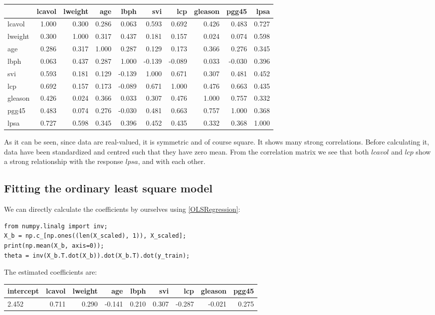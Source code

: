 \documentclass[12pt, letterpaper]{article}
\theoremstyle{definition}
\begin{document}
\begin{tabular}{lrrrrrrrrr}
\toprule
{} &  lcavol &  lweight &    age &   lbph &    svi &    lcp &  gleason &  pgg45 &   lpsa \\
\midrule
lcavol  &   1.000 &    0.300 &  0.286 &  0.063 &  0.593 &  0.692 &    0.426 &  0.483 &  0.727 \\
lweight &   0.300 &    1.000 &  0.317 &  0.437 &  0.181 &  0.157 &    0.024 &  0.074 &  0.598 \\
age     &   0.286 &    0.317 &  1.000 &  0.287 &  0.129 &  0.173 &    0.366 &  0.276 &  0.345 \\
lbph    &   0.063 &    0.437 &  0.287 &  1.000 & -0.139 & -0.089 &    0.033 & -0.030 &  0.396 \\
svi     &   0.593 &    0.181 &  0.129 & -0.139 &  1.000 &  0.671 &    0.307 &  0.481 &  0.452 \\
lcp     &   0.692 &    0.157 &  0.173 & -0.089 &  0.671 &  1.000 &    0.476 &  0.663 &  0.435 \\
gleason &   0.426 &    0.024 &  0.366 &  0.033 &  0.307 &  0.476 &    1.000 &  0.757 &  0.332 \\
pgg45   &   0.483 &    0.074 &  0.276 & -0.030 &  0.481 &  0.663 &    0.757 &  1.000 &  0.368 \\
lpsa    &   0.727 &    0.598 &  0.345 &  0.396 &  0.452 &  0.435 &    0.332 &  0.368 &  1.000 \\
\bottomrule
\end{tabular}
As it can be seen, since data are real-valued, it is symmetric and of course square. It shows many strong correlations. Before calculating it, data have been standardized and centred such that they have zero mean. From the correlation matrix we see that both $lcavol$ and $lcp$ show a strong relationship with the response $lpsa$, and with each other.

\subsection{Fitting the ordinary least square model}
We can directly calculate the coefficients by ourselves using \ref{OLSRegression}:
\begin{lstlisting}
from numpy.linalg import inv;
X_b = np.c_[np.ones((len(X_scaled), 1)), X_scaled];
print(np.mean(X_b, axis=0));
theta = inv(X_b.T.dot(X_b)).dot(X_b.T).dot(y_train);
\end{lstlisting}
The estimated coefficients are:

\begin{tabular}{lr|r|r|r|r|r|r|r|}
\toprule
 intercept &  lcavol &  lweight &    age &  lbph &    svi &    lcp &  gleason &  pgg45 \\
\midrule
2.452 &  0.711 &  0.290 & -0.141  &  0.210 &  0.307  & -0.287 & -0.021 &  0.275 \\
\bottomrule
\end{tabular}
\end{document}
